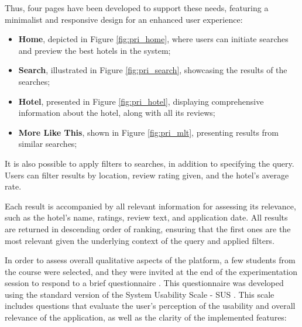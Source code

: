\documentclass[sigconf]{acmart}
\begin{document}
Thus, four pages have been developed to support these needs, featuring a minimalist and responsive design for an enhanced user experience:

\begin{itemize}
    \item \textbf{Home}, depicted in Figure \ref{fig:pri_home}, where users can initiate searches and preview the best hotels in the system;
    \item \textbf{Search}, illustrated in Figure \ref{fig:pri_search}, showcasing the results of the searches;
    \item \textbf{Hotel}, presented in Figure \ref{fig:pri_hotel}, displaying comprehensive information about the hotel, along with all its reviews;
    \item \textbf{More Like This}, shown in Figure \ref{fig:pri_mlt}, presenting results from similar searches;
\end{itemize}

It is also possible to apply filters to searches, in addition to specifying the query. Users can filter results by location, review rating given, and the hotel's average rate.

Each result is accompanied by all relevant information for assessing its relevance, such as the hotel's name, ratings, review text, and application date. All results are returned in descending order of ranking, ensuring that the first ones are the most relevant given the underlying context of the query and applied filters.

In order to assess overall qualitative aspects of the platform, a few students from the course were selected, and they were invited at the end of the experimentation session to respond to a brief questionnaire \cite{Sus_form}. This questionnaire was developed using the standard version of the System Usability Scale - SUS \cite{SUS}. This scale includes questions that evaluate the user's perception of the usability and overall relevance of the application, as well as the clarity of the implemented features:
\end{document}
